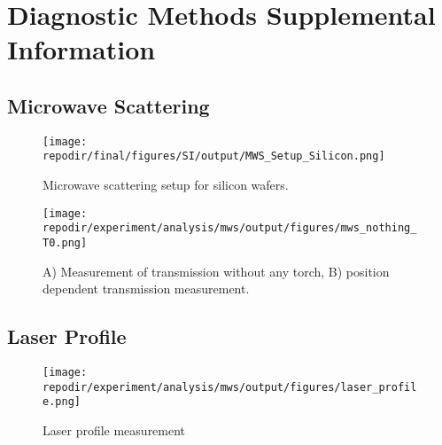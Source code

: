 \section{Diagnostic Methods Supplemental Information}

\subsection{Microwave Scattering}

\begin{figure}[]
\centering
\texttt{[image: \\repodir/final/figures/SI/output/MWS\_Setup\_Silicon.png]}
\caption{Microwave scattering setup for silicon wafers.}
\label{fig:SI_MWS_Setup_Silicon}
\end{figure}

\begin{figure}[]
\centering
\texttt{[image: \\repodir/experiment/analysis/mws/output/figures/mws\_nothing\_T0.png]}
\caption{A) Measurement of transmission without any torch, B) position dependent transmission measurement.}
\label{fig:SI_MWS}
\end{figure}

\subsection{Laser Profile}


\begin{figure}[]
\centering
\texttt{[image: \\repodir/experiment/analysis/mws/output/figures/laser\_profile.png]}
\caption{Laser profile measurement}
\label{fig:SI_Laser_Profile}
\end{figure}